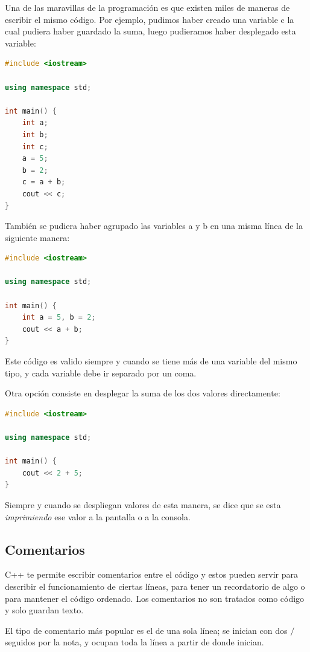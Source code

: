 \documentclass{article}
\begin{document}
Una de las maravillas de la programación es que existen miles de maneras de escribir el mismo código. Por ejemplo, pudimos haber creado una variable c la cual pudiera haber guardado la suma, luego pudieramos haber desplegado esta variable:

\begin{lstlisting}[language=C++, title=¿El mismo programa?]
#include <iostream>

using namespace std;

int main() {
	int a;
	int b;
	int c;
	a = 5;
	b = 2;
	c = a + b;
	cout << c;
}
\end{lstlisting}

También se pudiera haber agrupado las variables a y b en una misma línea de la siguiente manera:

\begin{lstlisting}[language=C++, title=¿El mismo programa?]
#include <iostream>

using namespace std;

int main() {
	int a = 5, b = 2;
	cout << a + b;
}
\end{lstlisting}

Este código es valido siempre y cuando se tiene más de una variable del mismo tipo, y cada variable debe ir separado por un coma.

Otra opción consiste en desplegar la suma de los dos valores directamente:

\begin{lstlisting}[language=C++, title=¿El mismo programa?]
#include <iostream>

using namespace std;

int main() {
	cout << 2 + 5;
}
\end{lstlisting}

Siempre y cuando se despliegan valores de esta manera, se dice que se esta \textit{imprimiendo} ese valor a la pantalla o a la consola.

\subsection{Comentarios}

C++ te permite escribir comentarios entre el código y estos pueden servir para describir el funcionamiento de ciertas líneas, para tener un recordatorio de algo o para mantener el código ordenado. Los comentarios no son tratados como código y solo guardan texto.

El tipo de comentario más popular es el de una sola línea; se inician con dos $/$ seguidos por la nota, y ocupan toda la línea a partir de donde inician.
\end{document}
